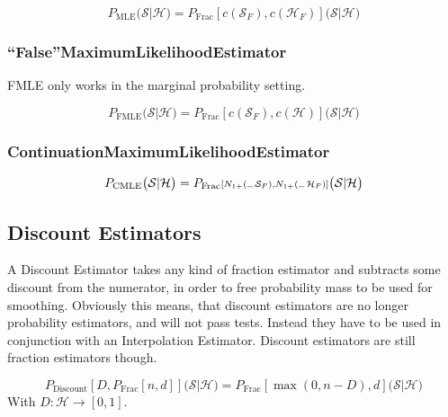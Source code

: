 \documentclass[11pt,a4paper]{article}
\newcommand{\Seq}{\mathcal{S}}
\newcommand{\Hist}{\mathcal{H}}
\newcommand{\SeqF}{\mathcal{S}_F}
\newcommand{\HistF}{\mathcal{H}_F}
\newcommand{\Skp}{\rule{7pt}{.5pt}}
\newcommand{\SmallSkp}{\rule{5pt}{.3pt}}
\begin{document}
  \begin{equation}
    P_\mathrm{MLE}\big(\Seq | \Hist\big) = P_\mathrm{Frac}{\scriptstyle[c(\SeqF) , c(\HistF)]}\big(\Seq | \Hist\big)
  \end{equation}

  \subsubsection{``False''MaximumLikelihoodEstimator}

  FMLE only works in the marginal probability setting.

  \begin{equation}
    P_\mathrm{FMLE}\big(\Seq | \Hist\big) = P_\mathrm{Frac}{\scriptstyle[c(\SeqF) , c(\Hist)]}\big(\Seq | \Hist\big)
  \end{equation}

  \subsubsection{ContinuationMaximumLikelihoodEstimator}

  \begin{equation}
    P_\mathrm{CMLE}\big(\Seq | \Hist\big) = P_\mathrm{Frac}{\scriptstyle[N_{1+}(\SmallSkp \, \SeqF) , N_{1+}(\SmallSkp \, \HistF)]}\big(\Seq | \Hist\big)
  \end{equation}


  \subsection{Discount Estimators}

  A Discount Estimator takes any kind of fraction estimator and subtracts some
  discount from the numerator, in order to free probability mass to be used for
  smoothing. Obviously this means, that discount estimators are no longer
  probability estimators, and will not pass tests. Instead they have to be used
  in conjunction with an Interpolation Estimator. Discount estimators are still
  fraction estimators though.

  \begin{equation}
    P_\mathrm{Discount}{\scriptstyle[D,P_\mathrm{Frac}[n,d]]}\big(\Seq | \Hist\big) = P_\mathrm{Frac}{\scriptstyle[\max(0,n-D),d]}\big(\Seq | \Hist\big)
  \end{equation}
  With $D: \Hist \to [0,1]$.
\end{document}
